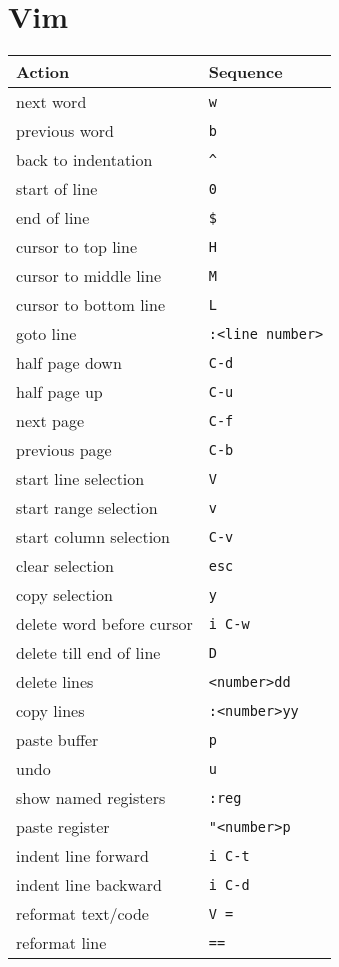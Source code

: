 \documentclass[report,twocolumn]{IEEEtran}
\begin{document}
\section{Vim}
\begin{center}
\begin{tabular}{ l | l }
\hline
Action & Sequence\\
\hline
next word & \texttt{w} \\
previous word & \texttt{b} \\
back to indentation & \texttt{\^} \\
start of line & \texttt{0} \\
end of line & \texttt{\$} \\
cursor to top line & \texttt{H} \\
cursor to middle line & \texttt{M} \\
cursor to bottom line & \texttt{L} \\
goto line & \texttt{:<line number>} \\
half page down & \texttt{C-d} \\
half page up & \texttt{C-u} \\
next page & \texttt{C-f} \\
previous page & \texttt{C-b} \\
\hline
start line selection & \texttt{V} \\
start range selection & \texttt{v} \\
start column selection & \texttt{C-v} \\
clear selection & \texttt{esc} \\
copy selection & \texttt{y} \\
\hline
delete word before cursor & \texttt{i C-w} \\
delete till end of line & \texttt{D} \\
delete lines & \texttt{<number>dd} \\
copy lines & \texttt{:<number>yy} \\
paste buffer & \texttt{p} \\
undo & \texttt{u} \\
show named registers & \texttt{:reg} \\
paste register & \texttt{"<number>p} \\
\hline
indent line forward & \texttt{i C-t} \\
indent line backward & \texttt{i C-d} \\
reformat text/code & \texttt{V =} \\
reformat line & \texttt{==} \\

\end{tabular}
\end{center}
\end{document}
